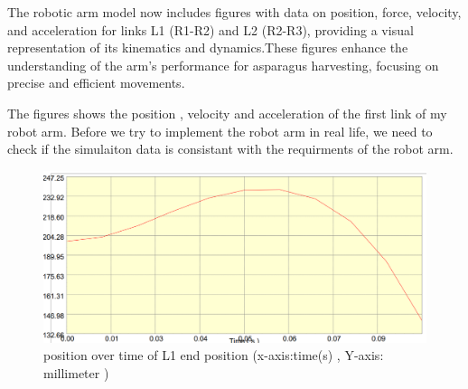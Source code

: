 The robotic arm model now includes figures with data on position, force, velocity, and acceleration for links L1 (R1-R2) and L2 (R2-R3), providing a visual representation of its kinematics and dynamics.These figures enhance the understanding of the arm’s performance for asparagus harvesting, focusing on precise and efficient movements.

The  figures shows the position , velocity and acceleration of the first link of my robot arm. Before we try to implement the robot arm in real life, we need to check if the simulaiton data is consistant with the requirments of the robot arm.




\begin{figure}
    \centering
    \includegraphics[width=1\linewidth]{inventor/L1_position.png}
    \caption{position over time of L1 end position (x-axis:time(s) , Y-axis: millimeter )}
    \label{fig:enter-label}
\end{figure}

